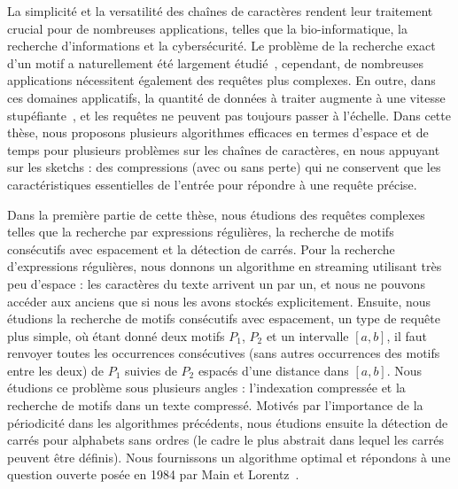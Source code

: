 La simplicité et la versatilité des chaînes de caractères rendent leur traitement crucial pour de nombreuses applications, telles que la bio-informatique, la recherche d'informations et la cybersécurité.
Le problème de la recherche exact d'un motif a naturellement été largement étudié~\cite{charras2004handbook}, cependant, de nombreuses applications nécessitent également des requêtes plus complexes. En outre, dans ces domaines applicatifs, la quantité de données à traiter augmente à une vitesse stupéfiante~\cite{muir2016real}, et les requêtes ne peuvent pas toujours passer à l'échelle.
Dans cette thèse, nous proposons plusieurs algorithmes efficaces en termes d'espace et de temps pour plusieurs problèmes sur les chaînes de caractères, en nous appuyant sur les sketchs : des compressions (avec ou sans perte) qui ne conservent que les caractéristiques essentielles de l'entrée pour répondre à une requête précise.

Dans la première partie de cette thèse, nous étudions des requêtes complexes telles que la recherche par expressions régulières, la recherche de motifs consécutifs avec espacement et la détection de carrés.
Pour la recherche d'expressions régulières, nous donnons un algorithme en streaming utilisant très peu d'espace : les caractères du texte arrivent un par un, et nous ne pouvons accéder aux anciens que si nous les avons stockés explicitement.
Ensuite, nous étudions la recherche de motifs consécutifs avec espacement, un type de requête plus simple, où étant donné deux motifs $P_1$, $P_2$ et un intervalle $[a, b]$, il faut renvoyer toutes les occurrences consécutives (sans autres occurrences des motifs entre les deux) de $P_1$ suivies  de $P_2$ espacés d'une distance dans $[a, b]$. Nous étudions ce problème sous plusieurs angles : l'indexation compressée et la recherche de motifs dans un texte compressé.
Motivés par l'importance de la périodicité dans les algorithmes précédents, nous étudions ensuite la détection de carrés pour alphabets sans ordres (le cadre le plus abstrait dans lequel les carrés peuvent être définis). Nous fournissons un algorithme optimal et répondons à une question ouverte posée en 1984 par Main et Lorentz~\cite{Main1984}.

